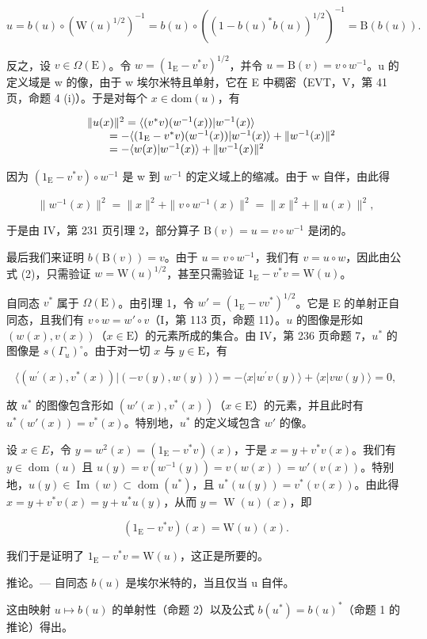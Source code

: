 \[
u = b (u) \circ (\mathrm{W} (u) ^ {1 / 2}) ^ {- 1} = b (u) \circ ((1 - b (u) ^ {*} b (u)) ^ {1 / 2}) ^ {- 1} = \mathrm{B} (b (u)).
\]

反之，设 \(v \in \Omega(\mathrm{E})\)。令 \(w = (1_{\mathrm{E}} - v^{*}v)^{1/2}\)，并令 \(u = \mathrm{B}(v) = v \circ w^{-1}\)。u 的定义域是 w 的像，由于 w 埃尔米特且单射，它在 E 中稠密（EVT，V，第 41 页，命题 4 (i)）。于是对每个 \(x \in \mathrm{dom}(u)\)，有

\[
\begin{array}{r l} & {\| u (x) \| ^ {2} = \langle (v ^ {*} v) (w ^ {- 1} (x)) | w ^ {- 1} (x) \rangle} \\ & {\qquad = - \langle (1 _ {\mathrm{E}} - v ^ {*} v) (w ^ {- 1} (x)) | w ^ {- 1} (x) \rangle + \| w ^ {- 1} (x) \| ^ {2}} \\ & {\qquad = - \langle w (x) | w ^ {- 1} (x) \rangle + \| w ^ {- 1} (x) \| ^ {2}} \end{array}
\]

因为 \((1_{\mathrm{E}} - v^{*}v) \circ w^{-1}\) 是 w 到 \(w^{-1}\) 的定义域上的缩减。由于 w 自伴，由此得

\[
\| w ^ {- 1} (x) \| ^ {2} = \| x \| ^ {2} + \| v \circ w ^ {- 1} (x) \| ^ {2} = \| x \| ^ {2} + \| u (x) \| ^ {2},
\]

于是由 IV，第 231 页引理 2，部分算子 \(\mathrm{B}(v) = u = v \circ w^{-1}\) 是闭的。

最后我们来证明 \(b(\mathrm{B}(v)) = v\)。由于 \(u = v \circ w^{-1}\)，我们有 \(v = u \circ w\)，因此由公式 (2)，只需验证 \(w = \mathrm{W}(u)^{1/2}\)，甚至只需验证 \(1_{\mathrm{E}} - v^{*}v = \mathrm{W}(u)\)。

自同态 \(v^*\) 属于 \(\Omega(\mathrm{E})\)。由引理 1，令 \(w' = (1_{\mathrm{E}} - vv^{*})^{1/2}\)。它是 E 的单射正自同态，且我们有 \(v \circ w = w' \circ v\)（I，第 113 页，命题 11）。\(u\) 的图像是形如 \((w(x), v(x))\)（\(x \in \mathrm{E}\)）的元素所成的集合。由 IV，第 236 页命题 7，\(u^*\) 的图像是 \(s(\Gamma_u)^{\circ}\)。由于对一切 \(x\) 与 \(y \in \mathrm{E}\)，有

\[
\langle (w ^ {\prime} (x), v ^ {*} (x)) | (- v (y), w (y)) \rangle = - \langle x | w ^ {\prime} v (y) \rangle + \langle x | v w (y) \rangle = 0,
\]

故 \(u^*\) 的图像包含形如 \((w'(x), v^*(x))\)（\(x \in \mathrm{E}\)）的元素，并且此时有 \(u^*(w'(x)) = v^*(x)\)。特别地，\(u^*\) 的定义域包含 \(w'\) 的像。

设 \(x \in E\)，令 \(y = w^{2}(x) = (1_{\mathrm{E}} - v^{*}v)(x)\)，于是 \(x = y + v^{*}v(x)\)。我们有 \(y \in \operatorname{dom}(u)\) 且 \(u(y) = v(w^{-1}(y)) = v(w(x)) = w'(v(x))\)。特别地，\(u(y) \in \operatorname{Im}(w) \subset \operatorname{dom}(u^{*})\)，且 \(u^{*}(u(y)) = v^{*}(v(x))\)。由此得 \(x = y + v^{*}v(x) = y + u^{*}u(y)\)，从而 \(y = \operatorname{W}(u)(x)\)，即

\[
(1 _ {\mathrm{E}} - v ^ {*} v) (x) = \mathrm{W} (u) (x).
\]

我们于是证明了 \(1_{\mathrm{E}} - v^{*}v = \mathrm{W}(u)\)，这正是所要的。

推论。--- 自同态 \(b(u)\) 是埃尔米特的，当且仅当 u 自伴。

这由映射 \(u \mapsto b(u)\) 的单射性（命题 2）以及公式 \(b(u^{*}) = b(u)^{*}\)（命题 1 的推论）得出。

